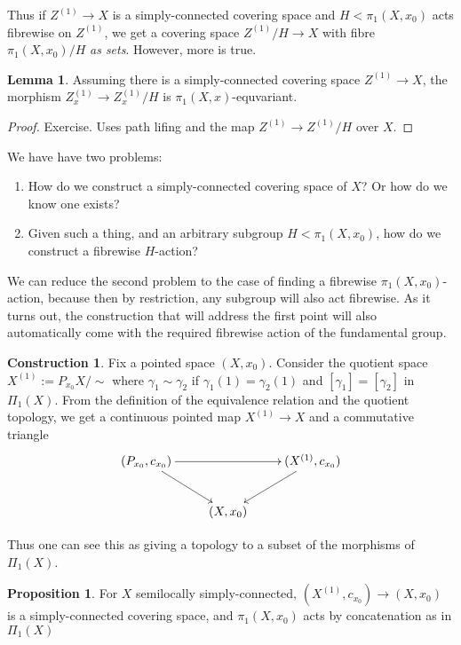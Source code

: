 \documentclass{tufte-handout}
\theoremstyle{definition}
\newtheorem{prop}{Proposition}
\newtheorem{lemma}{Lemma}
\newtheorem{construction}{Construction}
\begin{document}
Thus if $Z^{(1)} \to X$ is a simply-connected covering space and $H< \pi_1(X,x_0)$ acts fibrewise on $Z^{(1)}$, we get a covering space $Z^{(1)}/H \to X$ with fibre $\pi_1(X,x_0)/H$ \emph{as sets}. However, more is true.

\begin{lemma}
Assuming there is a simply-connected covering space $Z^{(1)} \to X$, the morphism $Z^{(1)}_x \to Z^{(1)}_x/H$ is $\pi_1(X,x)$-equvariant.
\end{lemma}

\begin{proof}
Exercise. Uses path lifing and the map $Z^{(1)} \to Z^{(1)}/H$ over $X$.
\end{proof}

We have have two problems:
\begin{enumerate}
\item How do we construct a simply-connected covering space of $X$? Or how do we know one exists?
\item Given such a thing, and an arbitrary subgroup $H<\pi_1(X,x_0)$, how do we construct a fibrewise $H$-action?
\end{enumerate}


We can reduce the second problem to the case of finding a fibrewise $\pi_1(X,x_0)$-action, because then by restriction, any subgroup will also act fibrewise. As it turns out, the construction that will address the first point will also automatically come with the required fibrewise action of the fundamental group.

\begin{construction}
Fix a pointed space $(X,x_0)$. Consider the quotient space $X^{(1)} := P_{x_0}X/\sim$ where $\gamma_1\sim \gamma_2$ if $\gamma_1(1)=\gamma_2(1)$ and $[\gamma_1]=[\gamma_2]$ in $\Pi_1(X)$. From the definition of the equivalence relation and the quotient topology, we get a continuous pointed map $X^{(1)} \to X$ and a commutative triangle
\[
	\xymatrix{
	(P_{x_0},c_{x_0}) \ar[rr] \ar[dr] && (X^{(1)},c_{x_0}) \ar[dl]\\
	& (X,x_0)
	}
\]
\end{construction}

Thus one can see this as giving a topology to a subset of the morphisms of $\Pi_1(X)$.

\begin{prop}
For $X$ semilocally simply-connected, $(X^{(1)},c_{x_0}) \to (X,x_0)$ is a simply-connected covering space, and $\pi_1(X,x_0)$ acts by concatenation as in $\Pi_1(X)$
\end{prop}
\end{document}
